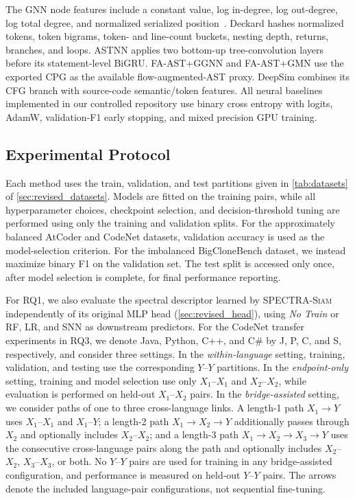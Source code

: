\documentclass[final,5p,times,twocolumn]{elsarticle}
\newcommand{\method}{\textsc{SPECTRA-Siam}}
\theoremstyle{plain}
\begin{document}
The GNN node features include a constant value, log in-degree, log out-degree, log total degree, and normalized serialized position~\cite{??}. Deckard hashes normalized tokens, token bigrams, token- and line-count buckets, nesting depth, returns, branches, and loops. ASTNN applies two bottom-up tree-convolution layers before its statement-level BiGRU. FA-AST+GGNN and FA-AST+GMN use the exported CPG as the available flow-augmented-AST proxy. DeepSim combines its CFG branch with source-code semantic/token features. All neural baselines implemented in our controlled repository use binary cross entropy with logits, AdamW, validation-F1 early stopping, and mixed precision GPU training.

\subsection{Experimental Protocol}
\label{sec:revised_protocol}
Each method uses the train, validation, and test partitions given in \autoref{tab:datasets} of \autoref{sec:revised_datasets}. Models are fitted on the training pairs, while all hyperparameter choices, checkpoint selection, and decision-threshold tuning are performed using only the training and validation splits.
For the approximately balanced AtCoder and CodeNet datasets, validation accuracy is used as the model-selection criterion. For the imbalanced BigCloneBench dataset, we instead maximize binary F1 on the validation set.
The test split is accessed only once, after model selection is complete, for final performance reporting.

For RQ1, we also evaluate the spectral descriptor learned by \method{} independently of its original MLP head (\autoref{sec:revised_head}), using \emph{No Train} or RF, LR, and SNN as downstream predictors. For the CodeNet transfer experiments in RQ3, we denote Java, Python, C++, and C\# by J, P, C, and S, respectively, and consider three settings. In the \emph{within-language} setting, training, validation, and testing use the corresponding $Y$--$Y$ partitions. In the \emph{endpoint-only} setting, training and model selection use only $X_1$--$X_1$ and $X_2$--$X_2$, while evaluation is performed on held-out $X_1$--$X_2$ pairs. In the \emph{bridge-assisted} setting, we consider paths of one to three cross-language links. A length-1 path $X_1\!\rightarrow Y$ uses $X_1$--$X_1$ and $X_1$--$Y$; a length-2 path $X_1\!\rightarrow X_2\!\rightarrow Y$ additionally passes through $X_2$ and optionally includes $X_2$--$X_2$; and a length-3 path $X_1\!\rightarrow X_2\!\rightarrow X_3\!\rightarrow Y$ uses the consecutive cross-language pairs along the path and optionally includes $X_2$--$X_2$, $X_3$--$X_3$, or both. No $Y$--$Y$ pairs are used for training in any bridge-assisted configuration, and performance is measured on held-out $Y$--$Y$ pairs. The arrows denote the included language-pair configurations, not sequential fine-tuning.
\end{document}
